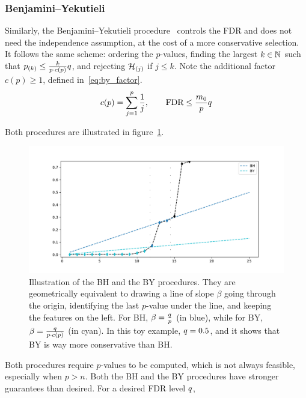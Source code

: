 \subsubsection{Benjamini–Yekutieli}\label{subsubsec:by}

Similarly, the Benjamini–Yekutieli procedure~\cite{by} controls the FDR and does not need the independence assumption,
at the cost of a more conservative selection.
It follows the same scheme:
ordering the $p$-values,
finding the largest $k \in \mathbb{N}$ such that $p_{(k)} \leq \frac{k}{p \cdot c(p)}q$,
and rejecting $\mathcal{H}_{(j)}$ if $j \leq k$.
Note the additional factor $c(p) \geq 1$, defined in~\ref{eq:by_factor}.
\begin{equation}\label{eq:by_factor}
        c(p) = \sum_{j = 1}^p \frac{1}{j}
        ,\qquad
        \text{FDR} \leq \frac{m_0}{p}q
\end{equation}


Both procedures are illustrated in figure~\ref{fig:bhy}.
\begin{figure}[h]
        \centering
        \includegraphics[width=1.\textwidth]{figures/bhy.pdf}
        \caption{
                Illustration of the BH and the BY procedures.
                They are geometrically equivalent to drawing a line of slope $\beta$ going through the origin,
                identifying the last $p$-value under the line, and keeping the features on the left.
                For BH, $\beta = \frac{q}{p}$ (in blue),
                while for BY, $\beta = \frac{q}{p \cdot c(p)}$ (in cyan).
                In this toy example, $q = 0.5$, and it shows that BY is way more conservative than BH.
        }
        \label{fig:bhy}
\end{figure}

Both procedures require $p$-values to be computed, which is not always feasible, especially when $p > n$.
Both the BH and the BY procedures have stronger guarantees than desired.
For a desired FDR level $q$,
\FloatBarrier
